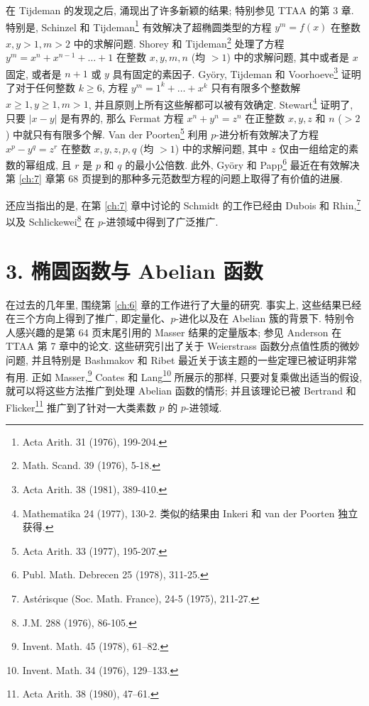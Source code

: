 在 Tijdeman 的发现之后, 涌现出了许多新颖的结果; 特别参见 TTAA 的第 3 章. 特别是, Schinzel 和 Tijdeman\footnote{Acta Arith. 31 (1976), 199-204.} 有效解决了超椭圆类型的方程 \(y^m = f(x)\) 在整数 \(x, y > 1, m > 2\) 中的求解问题. Shorey 和 Tijdeman\footnote{Math. Scand. 39 (1976), 5-18.} 处理了方程 \(y^m = x^n + x^{n-1} + \dots + 1\) 在整数 \(x, y, m, n\) (均 \({}>1\)) 中的求解问题, 其中或者是 \(x\) 固定, 或者是 \(n + 1\) 或 \(y\) 具有固定的素因子. Gy{\"o}ry, Tijdeman 和 Voorhoeve\footnote{Acta Arith. 38 (1981), 389-410.} 证明了对于任何整数 \(k \ge 6\), 方程 \(y^m = 1^k + \dots + x^k\) 只有有限多个整数解 \(x \ge 1, y \ge 1, m > 1\), 并且原则上所有这些解都可以被有效确定. Stewart\footnote{Mathematika 24 (1977), 130-2. 类似的结果由 Inkeri 和 van der Poorten 独立获得.} 证明了, 只要 \(|x-y|\) 是有界的, 那么 Fermat 方程 \(x^n + y^n = z^n\) 在正整数 \(x, y, z\) 和 \(n\) (\({}>2\)) 中就只有有限多个解. Van der Poorten\footnote{Acta Arith. 33 (1977), 195-207.} 利用 \(p\)-进分析有效解决了方程 \(x^p - y^q = z^r\) 在整数 \(x, y, z, p, q\) (均 \({}> 1\)) 中的求解问题, 其中 \(z\) 仅由一组给定的素数的幂组成, 且 \(r\) 是 \(p\) 和 \(q\) 的最小公倍数. 此外, Gy{\"o}ry 和 Papp\footnote{Publ. Math. Debrecen 25 (1978), 311-25.} 最近在有效解决第 \autoref{ch:7} 章第 68 页提到的那种多元范数型方程的问题上取得了有价值的进展.

还应当指出的是, 在第 \autoref{ch:7} 章中讨论的 Schmidt 的工作已经由 Dubois 和 Rhin,\footnote{Ast{\'e}risque (Soc. Math. France), 24-5 (1975), 211-27.} 以及 Schlickewei\footnote{J.M. 288 (1976), 86-105.} 在 \(p\)-进领域中得到了广泛推广.

\section*{3. 椭圆函数与 Abelian 函数}

在过去的几年里, 围绕第 \autoref{ch:6} 章的工作进行了大量的研究. 事实上, 这些结果已经在三个方向上得到了推广, 即定量化、\(p\)-进化以及在 Abelian 簇的背景下. 特别令人感兴趣的是第 64 页末尾引用的 Masser 结果的定量版本; 参见 Anderson 在 TTAA 第 7 章中的论文. 这些研究引出了关于 Weierstrass 函数分点值性质的微妙问题, 并且特别是 Bashmakov 和 Ribet 最近关于该主题的一些定理已被证明非常有用. 正如 Masser,\footnote{Invent. Math. 45 (1978), 61--82.} Coates 和 Lang\footnote{Invent. Math. 34 (1976), 129--133.} 所展示的那样, 只要对复乘做出适当的假设, 就可以将这些方法推广到处理 Abelian 函数的情形; 并且该理论已被 Bertrand 和 Flicker\footnote{Acta Arith. 38 (1980), 47--61.} 推广到了针对一大类素数 \(p\) 的 \(p\)-进领域.

